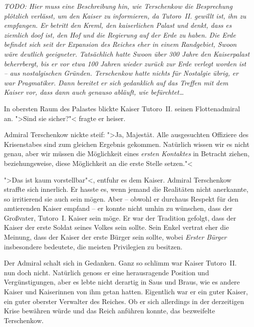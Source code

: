 \documentclass[11pt,twoside,openany]{scrbook}
\begin{document}
\mbox{}

{\sffamily\slshape\large TODO: Hier muss eine Beschreibung hin, wie Terschenkow die Besprechung plötzlich verlässt, um den Kaiser zu informieren, da Tutoro~II. gewillt ist, ihn zu empfangen. Er betritt den Kreml, den kaiserlichen Palast und denkt, dass es ziemlich doof ist, den Hof und die Regierung auf der Erde zu haben. Die Erde befindet sich seit der Expansion des Reiches eher in einem Randgebiet, Swoon wäre deutlich geeigneter. Tatsächlich hatte Swoon über 300 Jahre den Kaiserpalast beherrbergt, bis er vor etwa 100 Jahren wieder zurück zur Erde verlegt worden ist -- aus nostalgischen Gründen. Terschenkow hatte nichts für Nostalgie übrig, er war Pragmatiker. Dann bereitet er sich gedanklich auf das Treffen mit dem Kaiser vor, dass dann auch genauso abläuft, wie befürchtet\dots}

In obersten Raum des Palastes blickte Kaiser Tutoro~II. seinen Flottenadmiral an. ">Sind sie sicher?"< fragte er heiser.

Admiral Terschenkow nickte steif: ">Ja, Majestät. Alle ausgesuchten Offiziere des Krisenstabes sind zum gleichen Ergebnis gekommen. Natürlich wissen wir es nicht genau, aber wir müssen die Möglichkeit eines \emph{ersten Kontaktes} in Betracht ziehen, beziehungsweise, diese Möglichkeit an die erste Stelle setzen."<

">Das ist kaum vorstellbar"<, entfuhr es dem Kaiser. Admiral Terschenkow straffte sich innerlich. Er hasste es, wenn jemand die Realitäten nicht anerkannte, so irritierend sie auch sein mögen. Aber -- obwohl er durchaus Respekt für den amtierenden Kaiser empfand -- er konnte nicht umhin zu wünschen, dass der Großvater, Tutoro~I. Kaiser sein möge. Er war der Tradition gefolgt, dass der Kaiser der erste Soldat seines Volkes sein sollte. Sein Enkel vertrat eher die Meinung, dass der Kaiser der erste Bürger sein sollte, wobei \emph{Erster Bürger} insbesondere bedeutete, die meisten Privilegien zu besitzen.

Der Admiral schalt sich in Gedanken. Ganz so schlimm war Kaiser Tutoro~II. nun doch nicht. Natürlich genoss er eine herausragende Position und Vergünstigungen, aber es lebte nicht derartig in Saus und Braus, wie es andere Kaiser und Kaiserinnen von ihm getan hatten. Eigentlich war er ein guter Kaiser, ein guter oberster Verwalter des Reiches. Ob er sich allerdings in der derzeitigen Krise bewähren würde und das Reich anführen konnte, das bezweifelte Terschenkow.
\end{document}
